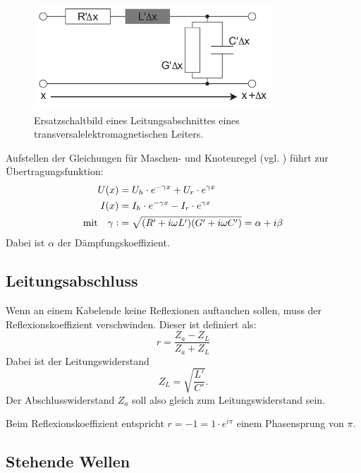 \documentclass[
	a4paper,
	12pt,
	pagesize,
	ngerman
]{scrartcl}
\begin{document}
	\begin{figure}[H]
		\includegraphics[width=0.8\textwidth]{img/ersatzschaltbild}
		\centering
		\caption{
			Ersatzschaltbild eines Leitungsabschnittes eines transversalelektromagnetischen Leiters. \cite{Anleitung}
		}
		\label{fig_ersatzschaltbild}
		\centering
	\end{figure}

	Aufstellen der Gleichungen für Maschen- und Knotenregel (vgl. \cite{Anleitung} ) führt zur Übertragungsfunktion:
	\begin{align}
		U(x) &= U_h \cdot e^{-\gamma x} + U_r \cdot e^{\gamma x}\\
		I(x) &= I_h \cdot e^{-\gamma x} - I_r \cdot e^{\gamma x}\\
		\text{mit} \quad \gamma \vcentcolon &= \sqrt{(R'+i \omega L')(G' +i \omega C')} = \alpha + i \beta
	\end{align}
	Dabei ist $\alpha $ der Dämpfungskoeffizient.

	\subsection{Leitungsabschluss}
	Wenn an einem Kabelende keine Reflexionen auftauchen sollen, muss der Reflexionskoeffizient verschwinden.
	Dieser ist definiert als:
	\begin{equation}
		r = \frac{Z_a-Z_L}{Z_a+Z_L} %
	\end{equation}
	Dabei ist der  Leitungswiderstand
	\begin{equation}
		Z_L=\sqrt{\frac{L'}{C'}}.
	\end{equation}
	Der Abschlusswiderstand $Z_a$ soll also gleich zum Leitungswiderstand sein.

	Beim Reflexionskoeffizient entspricht $r=-1=1 \cdot e^{i\pi}$ einem Phasensprung von $\pi$.

	\subsection{Stehende Wellen}
\end{document}
